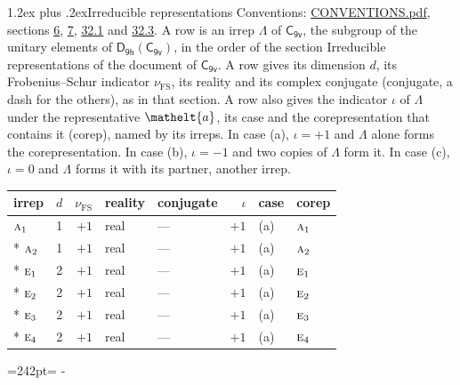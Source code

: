 \documentclass[10pt,a4paper]{article}
\makeatletter
\renewcommand\section{\@startsection{section}{1}{\z@}{-3ex plus -1ex minus -.2ex}%
  {1.2ex plus .2ex}{\normalfont\large\sffamily\bfseries\color{parttitle}}}
\newcommand{\needspace}[1]{\par\penalty-100\begingroup\dimen0=#1\relax\dimen2=\pagegoal
  \advance\dimen2-\pagetotal\ifdim\dimen0>\dimen2\relax\ifdim\dimen2>0pt\vfil\break\fi\fi
  \endgroup}
\numberwithin{equation}{section}
\newcommand{\eltfont}[1]{{\let\sigma\eltsigma\mathelt{#1}}}
\newcommand{\grp}[1]{\mathsf{#1}}
\newcommand{\irr}[1]{\text{\normalfont\scshape #1}}
\newcommand{\elt}[1]{\eltfont{#1}}
\newcommand{\fsind}{\nu_{\mathrm{FS}}}
\makeatother
\begin{document}
\section{Irreducible representations}\label{s:irreps}
Conventions: \href{../../CONVENTIONS.pdf}{CONVENTIONS.pdf}, sections \href{../../../rotation/CONVENTIONS.pdf\#conv.6}{6}, \href{../../../rotation/CONVENTIONS.pdf\#conv.7}{7}, \href{../../CONVENTIONS.pdf\#conv.32.1}{32.1} and \href{../../CONVENTIONS.pdf\#conv.32.3}{32.3}.
\leavevmode\label{n:irrep.Delta}A row is an irrep $\Lambda$ of $\grp{C_{9v}}$, the subgroup of the unitary elements of $\grp{D_{9h}}(\grp{C_{9v}})$, in the order of the section Irreducible representations of the document of \href{../../../rotation/data/pdf/C9v.pdf}{$\grp{C_{9v}}$}. \label{n:index.dimension}\label{n:index.frobenius}\label{n:head.irrep}\label{n:head.reality}\label{n:head.conjugate}A row gives its dimension $d$, its Frobenius--Schur indicator $\fsind$, its reality and its complex conjugate (conjugate, a dash for the others), as in that section. \label{n:head.case.corep}\label{n:head.corep}A row also gives the indicator $\iota$ of $\Lambda$ under the representative $\elt{a}$, its case and the corepresentation that contains it (corep), named by its irreps. In case (a), $\iota = +1$ and $\Lambda$ alone forms the corepresentation. In case (b), $\iota = -1$ and two copies of $\Lambda$ form it. In case (c), $\iota = 0$ and $\Lambda$ forms it with its partner, another irrep.
\setlength{\emergencystretch}{2em}\par\setlength{\emergencystretch}{0pt}
{\small\renewcommand{\arraystretch}{1.25}\setlength{\tabcolsep}{4pt}\begin{longtable}{@{}lrrllrll@{}}\toprule
irrep & $d$ & $\fsind$ & reality & conjugate & $\iota$ & case & corep\\\midrule\endhead
\bottomrule\endfoot\endlastfoot
$\irr{a}_{1}$ & 1 & $+1$ & real & --- & $+1$ & (a) & $\irr{a}_{1}$\\*
$\irr{a}_{2}$ & 1 & $+1$ & real & --- & $+1$ & (a) & $\irr{a}_{2}$\\*
$\irr{e}_{1}$ & 2 & $+1$ & real & --- & $+1$ & (a) & $\irr{e}_{1}$\\*
$\irr{e}_{2}$ & 2 & $+1$ & real & --- & $+1$ & (a) & $\irr{e}_{2}$\\*
$\irr{e}_{3}$ & 2 & $+1$ & real & --- & $+1$ & (a) & $\irr{e}_{3}$\\*
$\irr{e}_{4}$ & 2 & $+1$ & real & --- & $+1$ & (a) & $\irr{e}_{4}$\\
\bottomrule\end{longtable}}
\needspace{242pt}
\end{document}
